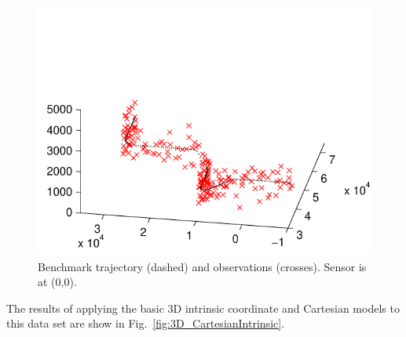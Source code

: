 \documentclass[conference]{IEEEtran}
\begin{document}
\begin{figure}
\centering
\includegraphics[width=0.95\columnwidth]{images/3Dbenchmark_problem.pdf}
\caption{Benchmark trajectory (dashed) and observations (crosses). Sensor is at (0,0).}
\label{fig:3D_ground_truth}
\end{figure}

The results of applying the basic 3D intrinsic coordinate and Cartesian models to this data set are show in Fig.~\ref{fig:3D_CartesianIntrinsic}.
\end{document}
